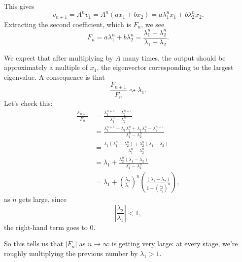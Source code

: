 \documentclass[11pt]{article}
\begin{document}
\begin{enumerate}
\begin{enumerate}
%
%

This gives
\[v_{n+1} = A^{n}v_1  = A^{n}(ax_1 + bx_2) = a\lambda_1^{n}x_1 + b\lambda_2^{n}x_2.\]
Extracting the second coefficient, which is $F_n$, we see
\[F_n = a\lambda_1^n + b\lambda_2^n = \frac{\lambda_1^n - \lambda_2^n}{\lambda_1 - \lambda_2}. \]

We expect that after multiplying by $A$ many times, the output should be approximately a multiple of $x_1$, the eigenvector corresponding to the largest eigenvalue.  A consequence is that 
\[\frac{F_{n+1}}{F_n} \rightsquigarrow \lambda_1.\]
Let's check this:
\begin{align*}
\frac{F_{n+1}}{F_n} &= \frac{\lambda_1^{n+1} - \lambda_2^{n+1}}{\lambda_1^n - \lambda_2^n} \\
&= \frac{\lambda_1^{n+1} - \lambda_1\lambda_2^n + \lambda_1\lambda_2^n - \lambda_2^{n+1}}{\lambda_1^n - \lambda_2^n}  \\
&= \frac{\lambda_1(\lambda_1^{n} - \lambda_2^n) + \lambda_2^n(\lambda_1 - \lambda_2)}{\lambda_1^n - \lambda_2^n} \\
&= \lambda_1 + \frac{\lambda_2^n(\lambda_1 - \lambda_2)}{\lambda_1^n - \lambda_2^n} \\
&= \lambda_1 + \left(\frac{\lambda_2}{\lambda_1}\right)^n \left(\frac{(\lambda_1 - \lambda_2)}{1 - \left(\frac{\lambda_2}{\lambda_1}\right)^n}\right),
\end{align*}
as $n$ gets large, since
\[ \left| \frac{\lambda_2}{\lambda_1} \right| <1, \]
the right-hand term goes to $0$.

So this tells us that $|F_n|$ as $n \to \infty$ is getting very large: at every stage, we're roughly multiplying the previous number by $\lambda_1 > 1$.


\end{enumerate}


\end{enumerate}
\end{document}
